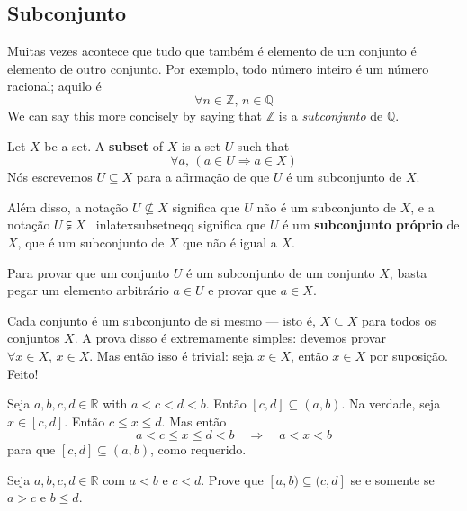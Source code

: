 \subsection*{Subconjunto}

Muitas vezes acontece que tudo que também é elemento de um conjunto é elemento de outro conjunto. Por exemplo, todo número inteiro é um número racional; aquilo é
\[ \forall n \in \mathbb{Z},\, n \in \mathbb{Q} \]
We can say this more concisely by saying that $\mathbb{Z}$ is a \textit{subconjunto} de $\mathbb{Q}$.

\begin{definition}
\label{defSubset}
Let $X$ be a set. A \textbf{subset} of $X$ is a set $U$ such that
\[ \forall a,\, (a \in U \Rightarrow a \in X) \]
Nós escrevemos $U \subseteq X$  para a afirmação de que $U$ é um subconjunto de $X$.

Além disso, a notação $U \nsubseteq X$  significa que $U$ não é um subconjunto de $X$, e a notação $U \subsetneqq X$ \ inlatex{subsetneqq} significa que $U$ é um \textbf{subconjunto próprio} de $X$, que é um subconjunto de $X$ que não é igual a $X$.
\end{definition}

\begin{strategy}
Para provar que um conjunto $U$ é um subconjunto de um conjunto $X$, basta pegar um elemento arbitrário $a \in U$ e provar que $a \in X$.
\end{strategy}

\begin{example}
Cada conjunto é um subconjunto de si mesmo --- isto é, $X \subseteq X$ para todos os conjuntos $X$. A prova disso é extremamente simples: devemos provar $\forall x \in X,\, x \in X$. Mas então isso é trivial: seja $x \in X$, então $x \in X$ por suposição. Feito!
\end{example}

\begin{example}
Seja $a,b,c,d \in \mathbb{R}$ with $a<c<d<b$. Então $[c,d] \subseteq (a,b)$. Na verdade, seja $x \in [c,d]$. Então $c \le x \le d$. Mas então
\[ a < c \le x \le d < b \quad \Rightarrow \quad a < x < b \]
para que $[c,d] \subseteq (a,b)$, como requerido.
\end{example}

\begin{exercise}
Seja $a,b,c,d \in \mathbb{R}$ com $a<b$ e $c<d$. Prove que $[a,b) \subseteq (c,d]$ se e somente se $a > c$ e $b \le d$.
\end{exercise}

